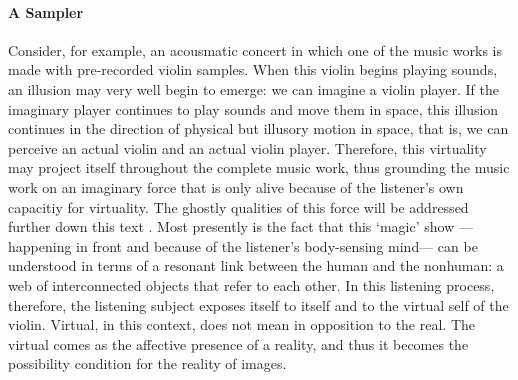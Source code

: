 \paragraph{A Sampler}
Consider, for example, an acousmatic concert in which one of the music works is made with pre-recorded violin samples. When this violin begins playing sounds, an illusion may very well begin to emerge: we can imagine a violin player. If the imaginary player continues to play sounds and move them in space, this illusion continues in the direction of physical but illusory motion in space, that is, we can perceive an actual violin and an actual violin player. Therefore, this virtuality may project itself throughout the complete music work, thus grounding the music work on an imaginary force that is only alive because of the listener's own capacitiy for virtuality. The ghostly qualities of this force will be addressed further down this text . Most presently is the fact that this `magic' show ---happening in front and because of the listener's body-sensing mind--- can be understood in terms of a resonant link between the human and the nonhuman: a web of interconnected objects that refer to each other. In this listening process, therefore, the listening subject exposes itself to itself and to the virtual self of the violin. Virtual, in this context, does not mean in opposition to the real. The virtual comes as the affective presence of a reality, and thus it becomes the possibility condition for the reality of images. 

